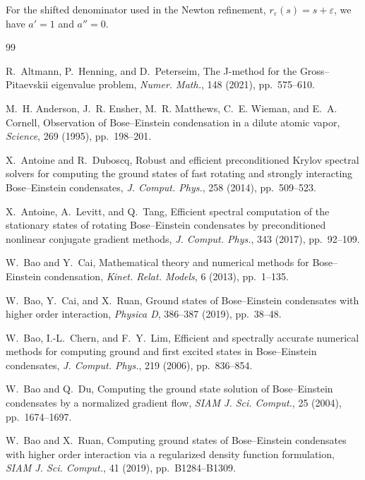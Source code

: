 \documentclass[11pt]{article}
\newcommand{\eps}{\varepsilon}
\theoremstyle{plain}
\theoremstyle{definition}
\numberwithin{equation}{section}
\begin{document}
For the shifted denominator used in the Newton refinement,
$r_\eps(s)=s+\eps$, we have $a'=1$ and $a''=0$.

\begin{thebibliography}{99}

R.~Altmann, P.~Henning, and D.~Peterseim,
\newblock The J-method for the Gross--Pitaevskii eigenvalue problem,
\newblock \emph{Numer. Math.}, 148 (2021), pp.~575--610.

M.~H. Anderson, J.~R. Ensher, M.~R. Matthews, C.~E. Wieman,
and E.~A. Cornell,
\newblock Observation of Bose--Einstein condensation in a dilute
atomic vapor,
\newblock \emph{Science}, 269 (1995), pp.~198--201.

X.~Antoine and R.~Duboscq,
\newblock Robust and efficient preconditioned Krylov spectral solvers
for computing the ground states of fast rotating and strongly
interacting Bose--Einstein condensates,
\newblock \emph{J. Comput. Phys.}, 258 (2014), pp.~509--523.

X.~Antoine, A.~Levitt, and Q.~Tang,
\newblock Efficient spectral computation of the stationary states of
rotating Bose--Einstein condensates by preconditioned nonlinear
conjugate gradient methods,
\newblock \emph{J. Comput. Phys.}, 343 (2017), pp.~92--109.

W.~Bao and Y.~Cai,
\newblock Mathematical theory and numerical methods for Bose--Einstein condensation,
\newblock \emph{Kinet. Relat. Models}, 6 (2013), pp.~1--135.

W.~Bao, Y.~Cai, and X.~Ruan,
\newblock Ground states of Bose--Einstein condensates with higher order interaction,
\newblock \emph{Physica D}, 386--387 (2019), pp.~38--48.

W.~Bao, I.-L.~Chern, and F.~Y.~Lim,
\newblock Efficient and spectrally accurate numerical methods for
computing ground and first excited states in Bose--Einstein
condensates,
\newblock \emph{J. Comput. Phys.}, 219 (2006), pp.~836--854.

W.~Bao and Q.~Du,
\newblock Computing the ground state solution of Bose--Einstein condensates by a
normalized gradient flow,
\newblock \emph{SIAM J. Sci. Comput.}, 25 (2004), pp.~1674--1697.

W.~Bao and X.~Ruan,
\newblock Computing ground states of Bose--Einstein condensates with higher order
interaction via a regularized density function formulation,
\newblock \emph{SIAM J. Sci. Comput.}, 41 (2019), pp.~B1284--B1309.


\end{thebibliography}
\end{document}
